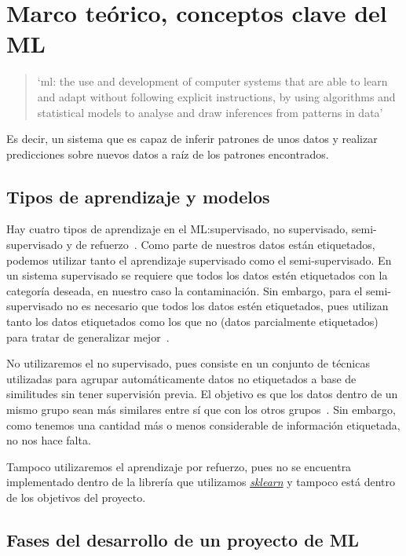 \section{Marco teórico, conceptos clave del ML}\label{sec:marco-teorico}

\begin{quote}
    `\gls{ml}: the use and development of computer systems that are able to learn and adapt without following explicit instructions, by using algorithms and statistical models to analyse and draw inferences from patterns in data'\ \cite{machinel18:online}
\end{quote}

Es decir, un sistema que es capaz de inferir patrones de unos datos y realizar predicciones sobre nuevos datos a raíz de los patrones encontrados. 


\subsection{Tipos de aprendizaje y modelos}

Hay cuatro tipos de aprendizaje en el ML:\@ supervisado, no supervisado, semi-supervisado y de refuerzo\ \cite{homl56}.
Como parte de nuestros datos están etiquetados, podemos utilizar tanto el aprendizaje supervisado como el semi-supervisado. En un sistema supervisado se requiere que todos los datos estén etiquetados con la categoría deseada, en nuestro caso la contaminación. Sin embargo, para el semi-supervisado no es necesario que todos los datos estén etiquetados, pues utilizan tanto los datos etiquetados como los que no (datos parcialmente etiquetados) para tratar de generalizar mejor\ \cite{homl56}.

No utilizaremos el no supervisado, pues consiste en un conjunto de técnicas utilizadas para agrupar automáticamente datos no etiquetados a base de similitudes sin tener supervisión previa. El objetivo es que los datos dentro de un mismo grupo sean más similares entre sí que con los otros grupos\ \cite{Clustera13:online}. Sin embargo, como tenemos una cantidad más o menos considerable de información etiquetada, no nos hace falta.

Tampoco utilizaremos el aprendizaje por refuerzo, pues no se encuentra implementado dentro de la librería que utilizamos \textit{\href{https://scikit-learn.org/stable/}{sklearn}} y tampoco está dentro de los objetivos del proyecto.


\subsection{Fases del desarrollo de un proyecto de ML}

